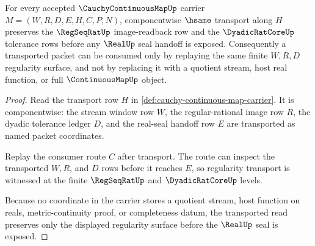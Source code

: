 \begin{theorem}
\label{thm:cauchy-continuous-map-regularity-transport}
For every accepted $\CauchyContinuousMapUp$ carrier $M=(W,R,D,E,H,C,P,N)$, componentwise $\hsame$ transport along $H$ preserves the $\RegSeqRatUp$ image-readback row and the $\DyadicRatCoreUp$ tolerance rows before any $\RealUp$ seal handoff is exposed. Consequently a transported packet can be consumed only by replaying the same finite $W,R,D$ regularity surface, and not by replacing it with a quotient stream, host real function, or full $\ContinuousMapUp$ object.
\end{theorem}
\begin{proof}
Read the transport row $H$ in \autoref{def:cauchy-continuous-map-carrier}. It is componentwise: the stream window row $W$, the regular-rational image row $R$, the dyadic tolerance ledger $D$, and the real-seal handoff row $E$ are transported as named packet coordinates.

Replay the consumer route $C$ after transport. The route can inspect the transported $W,R$, and $D$ rows before it reaches $E$, so regularity transport is witnessed at the finite $\RegSeqRatUp$ and $\DyadicRatCoreUp$ levels.

Because no coordinate in the carrier stores a quotient stream, host function on reals, metric-continuity proof, or completeness datum, the transported read preserves only the displayed regularity surface before the $\RealUp$ seal is exposed.
\end{proof}

